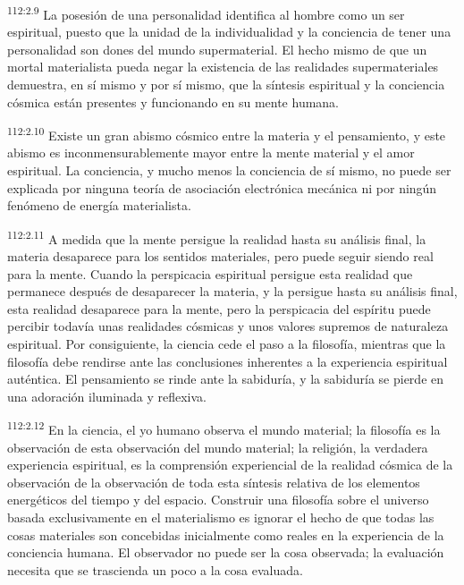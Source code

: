 \documentclass[twoside, 11pt]{book}
\begin{document}
\par
\textsuperscript{112:2.9} La posesión de una personalidad identifica al hombre como un ser espiritual, puesto que la unidad de la individualidad y la conciencia de tener una personalidad son dones del mundo supermaterial. El hecho mismo de que un mortal materialista pueda negar la existencia de las realidades supermateriales demuestra, en sí mismo y por sí mismo, que la síntesis espiritual y la conciencia cósmica están presentes y funcionando en su mente humana.

\par
\textsuperscript{112:2.10} Existe un gran abismo cósmico entre la materia y el pensamiento, y este abismo es inconmensurablemente mayor entre la mente material y el amor espiritual. La conciencia, y mucho menos la conciencia de sí mismo, no puede ser explicada por ninguna teoría de asociación electrónica mecánica ni por ningún fenómeno de energía materialista.

\par
\textsuperscript{112:2.11} A medida que la mente persigue la realidad hasta su análisis final, la materia desaparece para los sentidos materiales, pero puede seguir siendo real para la mente. Cuando la perspicacia espiritual persigue esta realidad que permanece después de desaparecer la materia, y la persigue hasta su análisis final, esta realidad desaparece para la mente, pero la perspicacia del espíritu puede percibir todavía unas realidades cósmicas y unos valores supremos de naturaleza espiritual. Por consiguiente, la ciencia cede el paso a la filosofía, mientras que la filosofía debe rendirse ante las conclusiones inherentes a la experiencia espiritual auténtica. El pensamiento se rinde ante la sabiduría, y la sabiduría se pierde en una adoración iluminada y reflexiva.

\par
\textsuperscript{112:2.12} En la ciencia, el yo humano observa el mundo material; la filosofía es la observación de esta observación del mundo material; la religión, la verdadera experiencia espiritual, es la comprensión experiencial de la realidad cósmica de la observación de la observación de toda esta síntesis relativa de los elementos energéticos del tiempo y del espacio. Construir una filosofía sobre el universo basada exclusivamente en el materialismo es ignorar el hecho de que todas las cosas materiales son concebidas inicialmente como reales en la experiencia de la conciencia humana. El observador no puede ser la cosa observada; la evaluación necesita que se trascienda un poco a la cosa evaluada.
\end{document}
